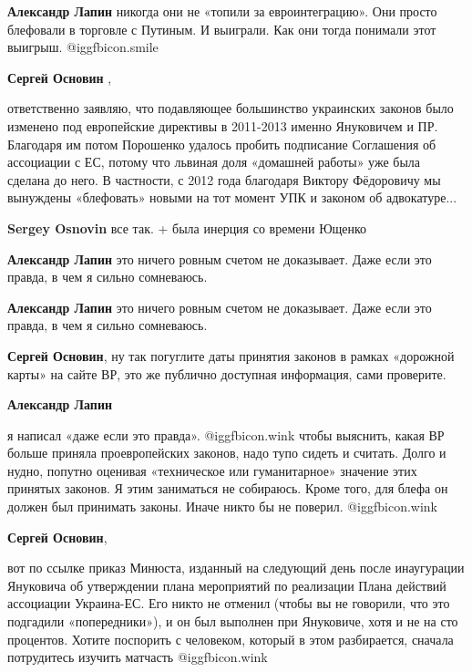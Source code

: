 \begin{itemize}
\begin{itemize} %
\textbf{Александр Лапин} никогда они не «топили за евроинтеграцию». Они просто блефовали в торговле с Путиным. И выиграли. Как они тогда понимали этот выигрыш.  @igg{fbicon.smile} 

\textbf{Сергей Основин} , 

ответственно заявляю, что подавляющее большинство украинских законов было
изменено под европейские директивы в 2011-2013 именно Януковичем и ПР.
Благодаря им потом Порошенко удалось пробить подписание Соглашения об
ассоциации с ЕС, потому что львиная доля «домашней работы» уже была сделана до
него. В частности, с 2012 года благодаря Виктору Фёдоровичу мы вынуждены
«блефовать» новыми на тот момент УПК и законом об адвокатуре...

\textbf{Sergey Osnovin} все так. + была инерция со времени Ющенко

\textbf{Александр Лапин} это ничего ровным счетом не доказывает. Даже если это правда, в чем я сильно сомневаюсь.

\textbf{Александр Лапин} это ничего ровным счетом не доказывает. Даже если это правда, в чем я сильно сомневаюсь.

\textbf{Сергей Основин}, ну так погуглите даты принятия законов в рамках «дорожной карты» на сайте ВР, это же публично доступная информация, сами проверите.

\textbf{Александр Лапин} 

я написал «даже если это правда».  @igg{fbicon.wink}  чтобы выяснить, какая ВР больше приняла
проевропейских законов, надо тупо сидеть и считать. Долго и нудно, попутно
оценивая «техническое или гуманитарное» значение этих принятых законов. Я этим
заниматься не собираюсь. Кроме того, для блефа он должен был принимать законы.
Иначе никто бы не поверил.  @igg{fbicon.wink} 

\textbf{Сергей Основин}, 

вот по ссылке приказ Минюста, изданный на следующий день после инаугурации
Януковича об утверждении плана мероприятий по реализации Плана действий
ассоциации Украина-ЕС. Его никто не отменил (чтобы вы не говорили, что это
подгадили «попередники»), и он был выполнен при Януковиче, хотя и не на сто
процентов. Хотите поспорить с человеком, который в этом разбирается, сначала
потрудитесь изучить матчасть  @igg{fbicon.wink} 


\end{itemize}
\end{itemize}
